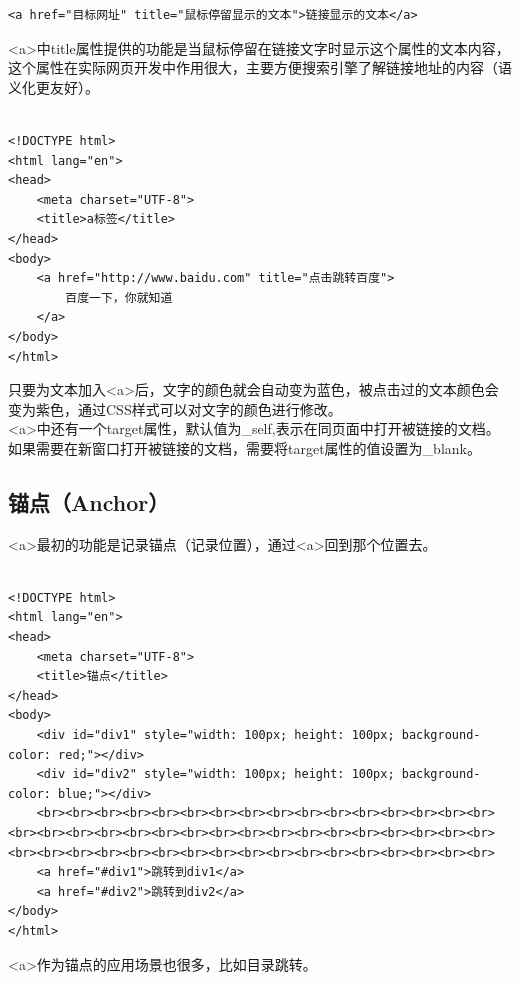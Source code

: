 \begin{lstlisting}[style=htmlcssjs]
<a href="目标网址" title="鼠标停留显示的文本">链接显示的文本</a>
\end{lstlisting}

<a>中title属性提供的功能是当鼠标停留在链接文字时显示这个属性的文本内容，这个属性在实际网页开发中作用很大，主要方便搜索引擎了解链接地址的内容（语义化更友好）。 \\

 \\
\begin{lstlisting}[style=htmlcssjs]
<!DOCTYPE html>
<html lang="en">
<head>
    <meta charset="UTF-8">
    <title>a标签</title>
</head>
<body>
    <a href="http://www.baidu.com" title="点击跳转百度">
        百度一下，你就知道
    </a>
</body>
</html>
\end{lstlisting}

只要为文本加入<a>后，文字的颜色就会自动变为蓝色，被点击过的文本颜色会变为紫色，通过CSS样式可以对文字的颜色进行修改。 \\

<a>中还有一个target属性，默认值为\_self,表示在同页面中打开被链接的文档。如果需要在新窗口打开被链接的文档，需要将target属性的值设置为\_blank。

\subsection{锚点（Anchor）}

<a>最初的功能是记录锚点（记录位置），通过<a>回到那个位置去。 \\

 \\
\begin{lstlisting}[style=htmlcssjs, breaklines=true, breakatwhitespace=false]
<!DOCTYPE html>
<html lang="en">
<head>
    <meta charset="UTF-8">
    <title>锚点</title>
</head>
<body>
    <div id="div1" style="width: 100px; height: 100px; background-color: red;"></div>
    <div id="div2" style="width: 100px; height: 100px; background-color: blue;"></div>
    <br><br><br><br><br><br><br><br><br><br><br><br><br><br><br><br><br><br><br><br><br><br><br><br><br><br><br><br><br><br><br><br><br><br><br><br><br><br><br><br><br><br><br><br><br><br><br><br><br><br>
    <a href="#div1">跳转到div1</a>
    <a href="#div2">跳转到div2</a>
</body>
</html>
\end{lstlisting}

<a>作为锚点的应用场景也很多，比如目录跳转。

